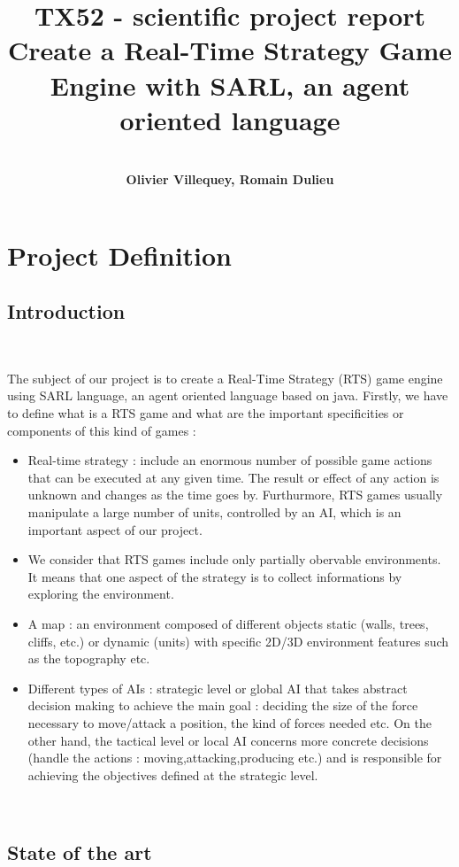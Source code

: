\documentclass[a4paper,10pt]{book}
\title{\textbf{TX52 - scientific project report }\\
  Create a Real-Time Strategy Game Engine with SARL, an agent oriented language}
\author{~\\
  \textbf{Olivier Villequey, Romain Dulieu} }
\begin{document}
\maketitle

\tableofcontents

\chapter{Project Definition}

\section {Introduction}

~

The subject of our project is to create a Real-Time Strategy (RTS) game engine using SARL language, an agent oriented language based on java.
Firstly, we have to define what is a RTS game and what are the important specificities or components of this kind of games :
\begin{itemize}
 \item Real-time strategy : include an enormous number of possible game actions that can be executed at any given time. The result or effect of any action is unknown
  and changes as the time goes by. Furthurmore, RTS games usually manipulate a large number of units, controlled by an AI, which is an important aspect of our project. 
 \item We consider that RTS games include only partially obervable environments. It means that one aspect of the strategy is to collect informations by exploring the environment.
 \item A map : an environment composed of different objects static (walls, trees, cliffs, etc.) or dynamic (units) with specific 2D/3D environment features such as the topography etc.
 \item Different types of AIs : strategic level or global AI that takes abstract decision making to achieve the main goal : deciding the size of the force necessary to move/attack a position, the kind of forces needed etc. 
  On the other hand, the tactical level or local AI concerns more concrete decisions (handle the actions : moving,attacking,producing etc.) and is responsible for achieving the objectives defined at the strategic level.
\end{itemize}

~

\section {State of the art}
\end{document}
